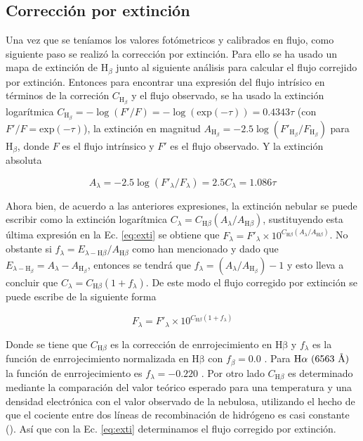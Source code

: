 \subsection{Corrección por extinción}
\label{sec:extintion}

Una vez que se teníamos los valores fotómetricos y calibrados en flujo, como siguiente paso se realizó la corrección por extinción. Para ello se ha usado un mapa de extinción de \(\text{H}_{\beta}\) junto al siguiente análisis para calcular el flujo correjido por extinción. Entonces para encontrar una expresión del flujo intrísico en términos de la correción \(C_{\text{H}_{\beta}}\) y el flujo observado, se ha usado la extinción logarítmica \(C_{\text{H}_{\beta}} = -\log(F'/F) = -\log (\text{exp}(-\tau)) = 0.4343\tau\) (con \(F'/F = \text{exp}(-\tau)\)),  la extinción en magnitud \(A_{\text{H}_{\beta}}=-2.5\log(F'_{\text{H}_{\beta}}/F_{\text{H}_{\beta}})\) para  \(\text{H}_{\beta}\), donde  \(F\) es el flujo intrínsico y \(F'\) es el flujo observado. Y la extinción absoluta  

\begin{equation}
A_{\lambda}=-2.5\log(F'_{\lambda}/F_{\lambda})=2.5C_{\lambda}=1.086\tau
\label{eq:exti}
\end{equation}

Ahora bien, de acuerdo a las anteriores expresiones, la extinción nebular se puede escribir como la extinción logarítmica \(C_{\lambda} = C_{\text{H}\beta}(A_{\lambda}/A_{\text{H}\beta})\), sustituyendo esta última expresión en la Ec. \ref{eq:exti} se obtiene que  \(F_{\lambda} = F'_{\lambda}\times10^{C_{\text{H}\beta}(A_{\lambda}/A_{\text{H}\beta})}\). No obstante si  \(f_{\lambda}= E_{\lambda-\text{H}\beta}/A_{\text{H}\beta}\) como han mencionado \citet{Costero:1970} y dado que \(E_{\lambda-\text{H}_{\beta}}=A_{\lambda}-A_{\text{H}_{\beta}}\), entonces se tendrá que \(f_{\lambda} = (A_{\lambda}/A_{\text{H}_{\beta}})-1\) y esto lleva a concluir que \(C_{\lambda}= C_{\text{H}\beta}(1+f_{\lambda})\). De este modo el flujo corregido por extinción se puede escribe de la siguiente forma

\begin{equation}
  \label{eq:flujo}
  F_{\lambda} = F'_{\lambda}\times10^{C_{\text{H}\beta}(1+f_{\lambda})}
\end{equation}

 Donde se tiene que \(C_{\text{H}\beta}\) es la corrección de enrrojecimiento en \(\mathrm{H\beta}\) y \(f_{\lambda}\) es la función de enrrojecimiento normalizada en \(\mathrm{H\beta}\) con \(f_{\beta}=0.0\) \citep{Peimbert:1977}. Para \(\mathrm{H}\alpha{}~(6563~\text{\AA{}}{})\) la función de enrrojecimiento es \(f_{\lambda} = -0.220\) \citep{Blagrave:2007}. Por otro lado \(C_{\text{H}\beta}\) es determinado mediante la comparación del valor teórico esperado para una temperatura y una densidad electrónica con el valor observado de la nebulosa, utilizando el hecho de que el cociente entre dos líneas de recombinación de hidrógeno es casi constante (\citeauthor{Peimbert:1977}). Así que con la Ec. \ref{eq:exti} determinamos el flujo corregido por extinción.

